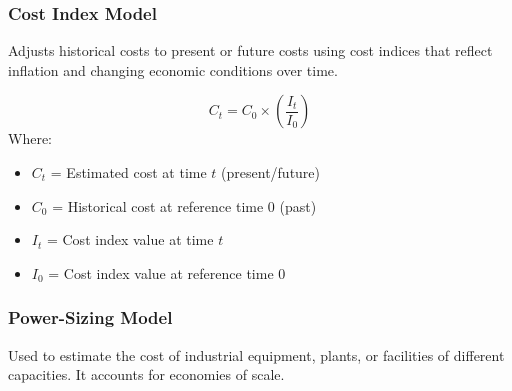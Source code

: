 \documentclass[12pt,a4paper]{article}
\begin{document}
\subsubsection{Cost Index Model}
Adjusts historical costs to present or future costs using cost indices that reflect inflation and changing economic conditions over time.

\begin{tcolorbox}[formulabox, title={\textbf{Cost Index Formula}}]
\begin{equation}
  C_t = C_0 \times \left( \frac{I_t}{I_0} \right)
\end{equation}
Where:
\begin{itemize}[leftmargin=1.5em, itemsep=1pt, topsep=2pt]
  \item[] $C_t$ = Estimated cost at time $t$ (present/future)
  \item[] $C_0$ = Historical cost at reference time $0$ (past)
  \item[] $I_t$ = Cost index value at time $t$
  \item[] $I_0$ = Cost index value at reference time $0$
\end{itemize}
\end{tcolorbox}

\subsubsection{Power-Sizing Model}
Used to estimate the cost of industrial equipment, plants, or facilities of different capacities. It accounts for economies of scale.
\end{document}
